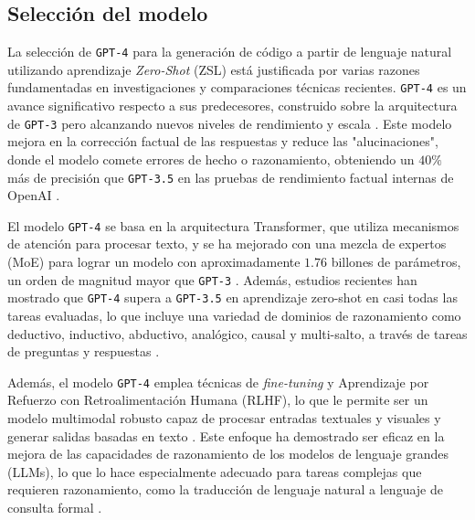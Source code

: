 \subsection{Selección del modelo} \label{model_selection}

La selección de \texttt{GPT-4} para la generación de código a partir de lenguaje natural utilizando aprendizaje \textit{Zero-Shot} (ZSL) está justificada por varias razones fundamentadas en investigaciones y comparaciones técnicas recientes.  \texttt{GPT-4} es un avance significativo respecto a sus predecesores, construido sobre la arquitectura de  \texttt{GPT-3} pero alcanzando nuevos niveles de rendimiento y escala \cite{}. Este modelo mejora en la corrección factual de las respuestas y reduce las "alucinaciones", donde el modelo comete errores de hecho o razonamiento, obteniendo un $40\%$ más de precisión que  \texttt{GPT-3.5} en las pruebas de rendimiento factual internas de OpenAI \cite{}.

El modelo  \texttt{GPT-4} se basa en la arquitectura Transformer, que utiliza mecanismos de atención para procesar texto, y se ha mejorado con una mezcla de expertos (MoE) para lograr un modelo con aproximadamente $1.76$ billones de parámetros, un orden de magnitud mayor que  \texttt{GPT-3} \cite{}. Además, estudios recientes han mostrado que  \texttt{GPT-4} supera a  \texttt{GPT-3.5} en aprendizaje zero-shot en casi todas las tareas evaluadas, lo que incluye una variedad de dominios de razonamiento como deductivo, inductivo, abductivo, analógico, causal y multi-salto, a través de tareas de preguntas y respuestas \cite{}.

Además, el modelo  \texttt{GPT-4} emplea técnicas de \textit{fine-tuning} y Aprendizaje por Refuerzo con Retroalimentación Humana (RLHF), lo que le permite ser un modelo multimodal robusto capaz de procesar entradas textuales y visuales y generar salidas basadas en texto \cite{}. Este enfoque ha demostrado ser eficaz en la mejora de las capacidades de razonamiento de los modelos de lenguaje grandes (LLMs), lo que lo hace especialmente adecuado para tareas complejas que requieren razonamiento, como la traducción de lenguaje natural a lenguaje de consulta formal \cite{}.

